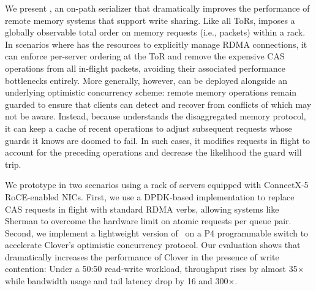 We present {\sword}, an on-path serializer
that dramatically improves the performance of remote memory systems
that support write sharing.  Like all ToRs, {\sword} imposes a
globally observable total order on memory requests (i.e., packets)
within a rack.  In scenarios where {\sword} has the resources to
explicitly manage RDMA connections, it can enforce per-server ordering
at the ToR and remove the expensive CAS operations from all in-flight
packets, avoiding their associated performance bottlenecks entirely.
More generally, however, {\sword} can be deployed alongside an
underlying optimistic concurrency scheme: remote memory operations
remain guarded to ensure that clients can detect and recover from
conflicts of which {\sword} may not be aware.  Instead, because
{\sword} understands the disaggregated memory protocol, it can keep a
cache of recent operations to adjust subsequent requests whose
guards it knows are doomed to fail.  In such cases,
it modifies requests in
flight to account for the preceding operations and decrease the
likelihood the guard will trip.

We prototype {\sword} in two scenarios using a rack of servers
equipped with ConnectX-5 RoCE-enabled NICs.  First, we use a
DPDK-based implementation to replace CAS requests in flight with
standard RDMA verbs, allowing systems like Sherman to overcome the
hardware limit on atomic requests per queue pair.  Second, we
implement a lightweight version of \sword\ on a P4 programmable switch
to accelerate Clover's optimistic concurrency protocol. Our evaluation
shows that {\sword} dramatically increases the performance of Clover
in the presence of write contention: Under a 50:50 read-write
workload, throughput rises by almost 35$\times$ while bandwidth usage and tail latency drop by 16 and 300$\times$.

